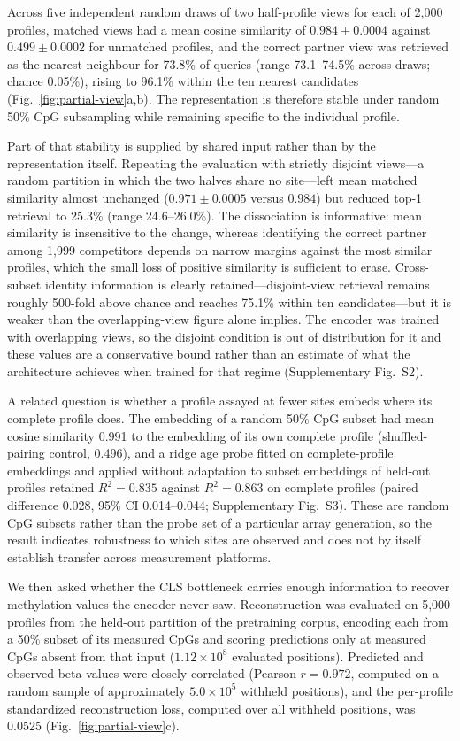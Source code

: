 Across five independent random draws of two half-profile views for each of 2,000 profiles,
matched views had a mean cosine similarity of $0.984\pm0.0004$ against $0.499\pm0.0002$ for
unmatched profiles, and the correct partner view was retrieved as the nearest neighbour for
73.8\% of queries (range 73.1--74.5\% across draws; chance 0.05\%), rising to 96.1\% within the
ten nearest candidates (Fig.~\ref{fig:partial-view}a,b). The representation is therefore stable
under random 50\% CpG subsampling while remaining specific to the individual profile.

Part of that stability is supplied by shared input rather than by the representation itself.
Repeating the evaluation with strictly disjoint views---a random partition in which the two
halves share no site---left mean matched similarity almost unchanged ($0.971\pm0.0005$ versus
$0.984$) but reduced top-1 retrieval to 25.3\% (range 24.6--26.0\%). The dissociation is
informative: mean similarity is insensitive to the change, whereas identifying the correct
partner among 1,999 competitors depends on narrow margins against the most similar profiles,
which the small loss of positive similarity is sufficient to erase. Cross-subset identity
information is clearly retained---disjoint-view retrieval remains roughly 500-fold above chance
and reaches 75.1\% within ten candidates---but it is weaker than the overlapping-view figure
alone implies. The encoder was trained with overlapping views, so the disjoint condition is out
of distribution for it and these values are a conservative bound rather than an estimate of
what the architecture achieves when trained for that regime (Supplementary Fig.~S2).

A related question is whether a profile assayed at fewer sites embeds where its complete
profile does. The embedding of a random 50\% CpG subset had mean cosine similarity 0.991 to the
embedding of its own complete profile (shuffled-pairing control, 0.496), and a ridge age probe
fitted on complete-profile embeddings and applied without adaptation to subset embeddings of
held-out profiles retained $R^2=0.835$ against $R^2=0.863$ on complete profiles (paired
difference 0.028, 95\% CI 0.014--0.044; Supplementary Fig.~S3). These are random CpG subsets
rather than the probe set of a particular array generation, so the result indicates robustness
to which sites are observed and does not by itself establish transfer across measurement
platforms.

We then asked whether the CLS bottleneck carries enough information to recover methylation
values the encoder never saw. Reconstruction was evaluated on 5,000 profiles from the held-out
partition of the pretraining corpus, encoding each from a 50\% subset of its measured CpGs and
scoring predictions only at measured CpGs absent from that input ($1.12\times10^{8}$ evaluated
positions). Predicted and observed beta values were closely correlated (Pearson $r=0.972$,
computed on a random sample of approximately $5.0\times10^{5}$ withheld positions), and the
per-profile standardized reconstruction loss, computed over all withheld positions, was 0.0525
(Fig.~\ref{fig:partial-view}c).

